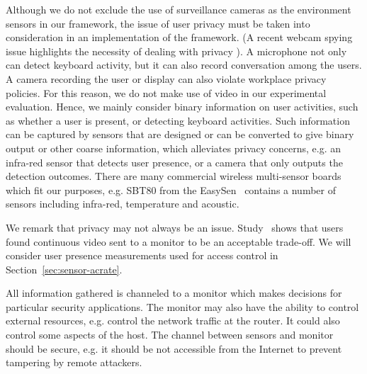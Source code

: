 Although we do not exclude the use of surveillance cameras as the
environment sensors in our framework, the issue of user privacy must
be taken into consideration in an implementation of the framework.
(A recent webcam spying issue highlights the necessity of dealing
with privacy \cite{webcam-spying}).
A microphone not only can detect keyboard activity, but it can also
record conversation among the users. A camera recording the user or
display can also violate workplace privacy policies.
For this reason,
we do not make use of video in our experimental evaluation.
Hence, we mainly consider binary information on user activities, such as
whether a user is present, or detecting keyboard activities.
Such
information can be captured by sensors that are designed or can be converted to give
binary output or other coarse information, which alleviates privacy
concerns, e.g. an infra-red sensor that detects user presence, or a
camera that only outputs the detection outcomes.
There are many commercial wireless multi-sensor
boards which fit our purposes, e.g.
SBT80 from the EasySen~\cite{EasySen}
contains a number of sensors including infra-red, temperature and acoustic.

We remark that privacy may not always be an issue.
Study~\cite{kwang2009usability} shows that users found continuous video sent to
a monitor to be an acceptable trade-off.
We will consider user presence measurements
used for access control in Section~\ref{sec:sensor-acrate}.

All information gathered is channeled to a
monitor which makes decisions for particular security applications.
The monitor may also have the ability to control
external resources, e.g. control the network traffic at the router.
It could also control some aspects of the host.
The channel between sensors and monitor should be secure,
e.g. it should be not accessible from the Internet to prevent 
tampering by remote attackers. 

